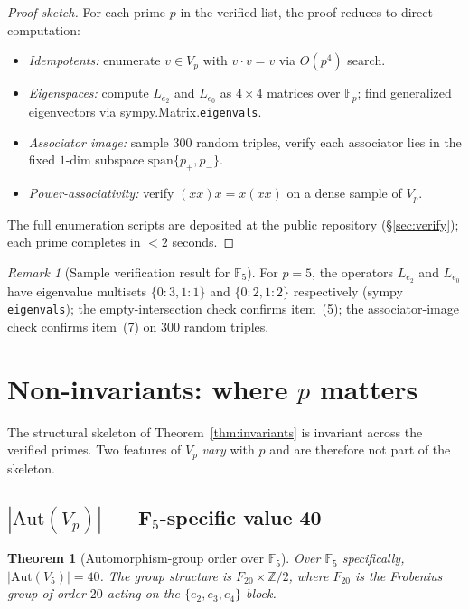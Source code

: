 \documentclass[11pt,reqno]{amsart}
\theoremstyle{plain}
\newtheorem{theorem}{Theorem}[section]
\theoremstyle{definition}
\theoremstyle{remark}
\newtheorem*{remark}{Remark}
\newcommand{\Z}{\mathbb{Z}}
\newcommand{\F}{\mathbb{F}}
\newcommand{\Aut}{\mathrm{Aut}}
\begin{document}
\begin{proof}[Proof sketch]
For each prime $p$ in the verified list, the proof reduces to direct
computation:
\begin{itemize}[leftmargin=2em]
\item \emph{Idempotents:} enumerate $v \in V_p$ with $v \cdot v = v$ via
$O(p^4)$ search.
\item \emph{Eigenspaces:} compute $L_{e_2}$ and $L_{e_0}$ as
$4 \times 4$ matrices over $\F_p$; find generalized eigenvectors via
sympy.Matrix.\texttt{eigenvals}.
\item \emph{Associator image:} sample $300$ random triples, verify each
associator lies in the fixed $1$-dim subspace
$\mathrm{span}\{p_+, p_-\}$.
\item \emph{Power-associativity:} verify $(x x) x = x (x x)$ on a
dense sample of $V_p$.
\end{itemize}
The full enumeration scripts are deposited at the public repository
(§\ref{sec:verify}); each prime completes in $<2$ seconds.
\end{proof}

\begin{remark}[Sample verification result for $\F_5$]
For $p = 5$, the operators $L_{e_2}$ and $L_{e_0}$ have eigenvalue
multisets $\{0:3, 1:1\}$ and $\{0:2, 1:2\}$ respectively (sympy
\texttt{eigenvals}); the empty-intersection check confirms item~(5);
the associator-image check confirms item~(7) on $300$ random triples.
\end{remark}

\section{Non-invariants: where $p$ matters}
\label{sec:non-invariants}

The structural skeleton of Theorem~\ref{thm:invariants} is invariant
across the verified primes. Two features of $V_p$ \emph{vary} with $p$
and are therefore not part of the skeleton.

\subsection{$|\Aut(V_p)|$ — F$_5$-specific value 40}

\begin{theorem}[Automorphism-group order over $\F_5$]
\label{thm:autF5}
Over $\F_5$ specifically, $|\Aut(V_5)| = 40$. The group structure is
$F_{20} \times \Z/2$, where $F_{20}$ is the Frobenius group of order
$20$ acting on the $\{e_2, e_3, e_4\}$ block.
\end{theorem}
\end{document}
